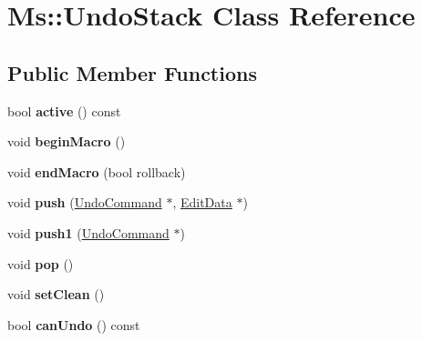 \hypertarget{class_ms_1_1_undo_stack}{}\section{Ms\+:\+:Undo\+Stack Class Reference}
\label{class_ms_1_1_undo_stack}
\subsection*{Public Member Functions}
\begin{DoxyCompactItemize}
\item 
\mbox{\label{class_ms_1_1_undo_stack_a28859b2b4e3a942386ca9cd9fcdac124}} 
bool {\bfseries active} () const
\item 
\mbox{\label{class_ms_1_1_undo_stack_a3732f9f283199021a56beb36d4bf610c}} 
void {\bfseries begin\+Macro} ()
\item 
\mbox{\label{class_ms_1_1_undo_stack_a4cb85a93b24d1bd1f04233fefa34798f}} 
void {\bfseries end\+Macro} (bool rollback)
\item 
\mbox{\label{class_ms_1_1_undo_stack_aa7194b0d69b582e8964eefdfa6db9e2c}} 
void {\bfseries push} (\hyperlink{class_ms_1_1_undo_command}{Undo\+Command} $\ast$, \hyperlink{class_ms_1_1_edit_data}{Edit\+Data} $\ast$)
\item 
\mbox{\label{class_ms_1_1_undo_stack_acea099f7ef736bea0b2f70cc6b12e341}} 
void {\bfseries push1} (\hyperlink{class_ms_1_1_undo_command}{Undo\+Command} $\ast$)
\item 
\mbox{\label{class_ms_1_1_undo_stack_a17cf177da3bfdb238b539b18e9dde836}} 
void {\bfseries pop} ()
\item 
\mbox{\label{class_ms_1_1_undo_stack_a6d06fa10ad7b12d5ebf2aa3f04a257a0}} 
void {\bfseries set\+Clean} ()
\item 
\mbox{\label{class_ms_1_1_undo_stack_a861d4d928673bf52ff3668e990025cd5}} 
bool {\bfseries can\+Undo} () const
\item 
\mbox{\label{class_ms_1_1_undo_stack_aeef2f560b545c87e1d1b5127c2d08206}} 

\end{DoxyCompactItemize}
